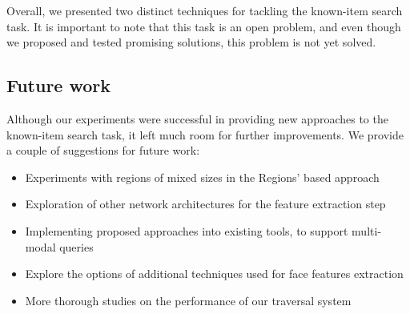 

\vspace{1em}

Overall, we presented two distinct techniques for tackling the known-item search task. It is important to note that this task is an open problem, and even though we proposed and tested promising solutions, this problem is not yet solved. 

\subsection*{Future work}

Although our experiments were successful in providing new approaches to the known-item search task, it left much room for further improvements. We provide a couple of suggestions for future work:

\begin{itemize}
    \item Experiments with regions of mixed sizes in the Regions' based approach
    \item Exploration of other network architectures for the feature extraction step
    \item Implementing proposed approaches into existing tools, to support multi-modal queries
    \item Explore the options of additional techniques used for face features extraction
    \item More thorough studies on the performance of our traversal system
\end{itemize}


